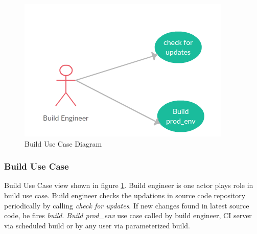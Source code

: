 \documentclass[a4paper,oneside,1,english1pt]{report}
\begin{document}
\begin{figure}[h]
	\includegraphics[width=\linewidth]{diagrams/BuildUseCase.png}
	\caption{Build Use Case Diagram}
	\label{fig:build_use_case_dia}
\end{figure}
\subsubsection{Build Use Case}
	Build Use Case view shown in figure \ref{fig:build_use_case_dia}. Build engineer is one actor plays role in build use case. Build engineer checks the updations in source code repository periodically by calling \textit{check for updates}. If new changes found in latest source code, he fires \textit{build}.
	\textit{Build prod\_env} use case called by build engineer,  \ac{CI} server via scheduled build or by any user via parameterized build.
	
\end{document}
